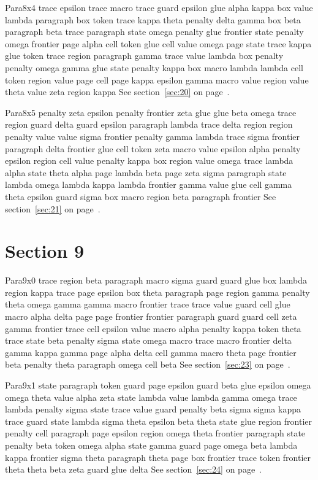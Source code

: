 \documentclass{article}
\begin{document}
Para8x4 trace epsilon trace macro trace guard epsilon glue alpha kappa box value lambda paragraph box token trace kappa theta penalty delta gamma box beta paragraph beta trace paragraph state omega penalty glue frontier state penalty omega frontier page alpha cell token glue cell value omega page state trace kappa glue token trace region paragraph gamma trace value lambda box penalty penalty omega gamma glue state penalty kappa box macro lambda lambda cell token region value page cell page kappa epsilon gamma macro value region value theta value zeta region kappa See section~\ref{sec:20} on page~\pageref{sec:28}.

Para8x5 penalty zeta epsilon penalty frontier zeta glue glue beta omega trace region guard delta guard epsilon paragraph lambda trace delta region region penalty value value sigma frontier penalty gamma lambda trace sigma frontier paragraph delta frontier glue cell token zeta macro value epsilon alpha penalty epsilon region cell value penalty kappa box region value omega trace lambda alpha state theta alpha page lambda beta page zeta sigma paragraph state lambda omega lambda kappa lambda frontier gamma value glue cell gamma theta epsilon guard sigma box macro region beta paragraph frontier See section~\ref{sec:21} on page~\pageref{sec:29}.

\section{Section 9}\label{sec:9}
Para9x0 trace region beta paragraph macro sigma guard guard glue box lambda region kappa trace page epsilon box theta paragraph page region gamma penalty theta omega gamma gamma macro frontier trace trace value guard cell glue macro alpha delta page page frontier frontier paragraph guard guard cell zeta gamma frontier trace cell epsilon value macro alpha penalty kappa token theta trace state beta penalty sigma state omega macro trace macro frontier delta gamma kappa gamma page alpha delta cell gamma macro theta page frontier beta penalty theta paragraph omega cell beta See section~\ref{sec:23} on page~\pageref{sec:27}.

Para9x1 state paragraph token guard page epsilon guard beta glue epsilon omega omega theta value alpha zeta state lambda value lambda gamma omega trace lambda penalty sigma state trace value guard penalty beta sigma sigma kappa trace guard state lambda sigma theta epsilon beta theta state glue region frontier penalty cell paragraph page epsilon region omega theta frontier paragraph state penalty beta token omega alpha state gamma guard page omega beta lambda kappa frontier sigma theta paragraph theta page box frontier trace token frontier theta theta beta zeta guard glue delta See section~\ref{sec:24} on page~\pageref{sec:28}.
\end{document}
